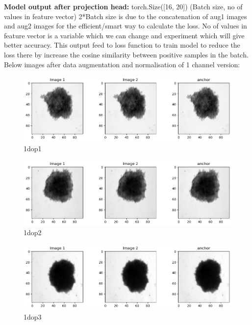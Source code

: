 \documentclass[12pt,twoside,a4paper,parskip]{scrbook} %
\begin{document}
  \textbf{Model output after projection head:} torch.Size([16, 20]) (Batch size, no of values in feature vector)  2*Batch size is due to the concatenation of aug1 images and aug2 images for the efficient/smart way to calculate the loss. No of values in feature vector is a variable which we can change and experiment which will give better accuracy. This output feed to loss function to train model to reduce the loss there by increase the cosine similarity between positive samples in the batch.
Below images after data augmentation and normalisation of 1 channel version:
\begin{figure}[H]
  \centering
  \includegraphics[width=0.9\linewidth]{figures/1dop1.png} %
  \caption{1dop1}
  \label{fig:1doutput1}
\end{figure}

\begin{figure}[H]
  \centering
  \includegraphics[width=0.9\linewidth]{figures/1dop2.png} %
  \caption{1dop2}
  \label{fig:1doutput2}
\end{figure}

\begin{figure}[H]
  \centering
  \includegraphics[width=0.9\linewidth]{figures/1dop3.png} %
  \caption{1dop3}
  \label{fig:1doutput3}
\end{figure}
\end{document}
